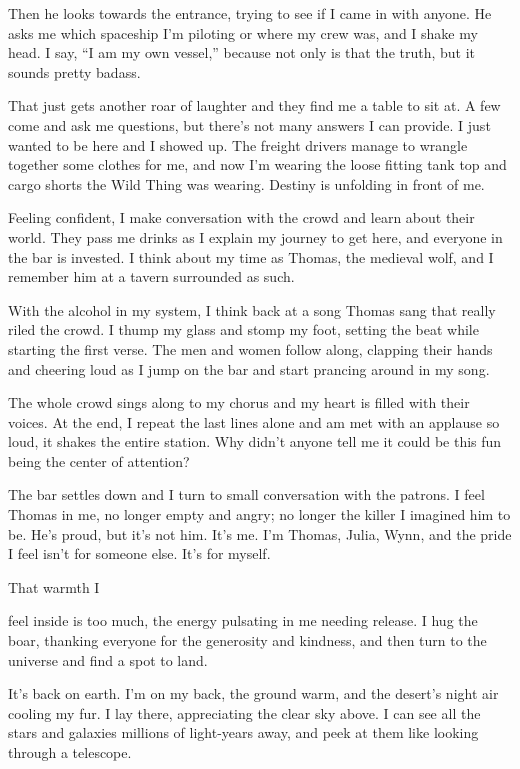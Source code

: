 Then he looks towards the entrance, trying to see if I came in with
anyone. He asks me which spaceship I'm piloting or where my crew was,
and I shake my head. I say, ``I am my own vessel,'' because not only is
that the truth, but it sounds pretty badass.

That just gets another roar of laughter and they find me a table to sit
at. A few come and ask me questions, but there's not many answers I can
provide. I just wanted to be here and I showed up. The freight drivers
manage to wrangle together some clothes for me, and now I'm wearing the
loose fitting tank top and cargo shorts the Wild Thing was wearing.
Destiny is unfolding in front of me.

Feeling confident, I make conversation with the crowd and learn about
their world. They pass me drinks as I explain my journey to get here,
and everyone in the bar is invested. I think about my time as Thomas,
the medieval wolf, and I remember him at a tavern surrounded as such.

With the alcohol in my system, I think back at a song Thomas sang that
really riled the crowd. I thump my glass and stomp my foot, setting the
beat while starting the first verse. The men and women follow along,
clapping their hands and cheering loud as I jump on the bar and start
prancing around in my song.

The whole crowd sings along to my chorus and my heart is filled with
their voices. At the end, I repeat the last lines alone and am met with
an applause so loud, it shakes the entire station. Why didn't anyone
tell me it could be this fun being the center of attention?

The bar settles down and I turn to small conversation with the patrons.
I feel Thomas in me, no longer empty and angry; no longer the killer I
imagined him to be. He's proud, but it's not him. It's me. I'm Thomas,
Julia, Wynn, and the pride I feel isn't for someone else. It's for
myself.

That warmth I

feel inside is too much, the energy pulsating in me needing release. I
hug the boar, thanking everyone for the generosity and kindness, and
then turn to the universe and find a spot to land.

It's back on earth. I'm on my back, the ground warm, and the desert's
night air cooling my fur. I lay there, appreciating the clear sky above.
I can see all the stars and galaxies millions of light-years away, and
peek at them like looking through a telescope.

